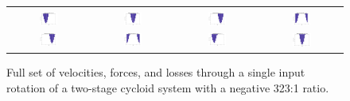 \begin{figure}[h]
\begin{tabular}{cccc}
	   \\
	   \hline
	   \\
	   \includegraphics[width=0.23\textwidth]{fig/double_1_neg_losses_0} &
	   \includegraphics[width=0.23\textwidth]{fig/double_1_neg_losses_pi_2} &
	   \includegraphics[width=0.23\textwidth]{fig/double_1_neg_losses_pi} &
	   \includegraphics[width=0.23\textwidth]{fig/double_1_neg_losses_3pi_2} \\
	   \includegraphics[width=0.23\textwidth]{fig/double_2_neg_losses_0} &
	   \includegraphics[width=0.23\textwidth]{fig/double_2_neg_losses_pi_2} &
	   \includegraphics[width=0.23\textwidth]{fig/double_2_neg_losses_pi} &
	   \includegraphics[width=0.25\textwidth]{fig/double_2_neg_losses_3pi_2} \\
   \end{tabular}
   \caption{Full set of velocities, forces, and losses through a single input rotation of a two-stage cycloid system with a negative 323:1 ratio.}
   \label{fig:two_stage_forces}
\end{figure}

